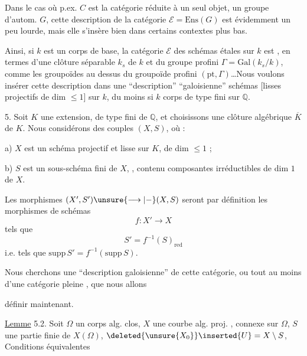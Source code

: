 Dans le cas où p.ex. $C$ est la catégorie réduite à un seul objet, un groupe d'autom. $G$, cette description de la catégorie $\mathcal E=\mathrm{Ens}(G)$ est évidemment un peu lourde, mais elle s'insère bien dans certains contextes plus bas.

Ainsi, si $k$ est un corps de base, la catégorie $\mathcal E$ des schémas étales sur $k$ est , en termes d'une clôture séparable $k_s$ de $k$ et du groupe profini $\Gamma=\mathrm{Gal}(k_s/k)$, comme les groupoïdes  au dessus du groupoïde profini $(\mathrm{pt},\Gamma)$\dots Nous voulons insérer cette description dans une ``description'' ``galoisienne''  \inserted{[certains]} schémas [lisses  projectifs de dim $\leq 1$] sur $k$, du moins si $k$ corps de type fini sur $\mathbb Q$.


5. Soit $K$ une extension, de type fini de $\mathbb Q$, et choisissons une clôture algébrique $\overline K$ de $K$.
 Nous considérons des couples $(X,S)$, où : 

a) $X$ est un schéma projectif et lisse sur $K$, de dim $\leq 1$ ;

b) $S$ est un sous-schéma fini  de $X$, , contenu     composantes irréductibles de dim $1$ de $X$.

Les morphismes $(X',S')\unsure{\longrightarrow|-}(X,S)$ seront par définition les morphismes de schémas
\[
f:X'\longrightarrow X
\]
tels que
\[
S'=f^{-1}(S)_{\mathrm{red}}
\]
i.e. tels que $\mathrm{supp}\,S'=f^{-1}(\mathrm{supp}\,S)$.

Nous cherchons une ``description galoisienne'' de cette catégorie, ou tout au moins d'une catégorie pleine , que nous allons


 définir maintenant.

\uline{Lemme} 5.2. Soit $\Omega$ un corps alg. clos, $X$ une  courbe alg. proj. , connexe sur $\Omega$, $S$ une partie finie de $X(\Omega)$,  $\deleted{\unsure{X_0}}\inserted{U}=X\setminus S$, Conditions équivalentes

